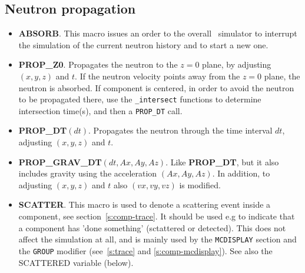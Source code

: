 \subsection{Neutron propagation}
\begin{itemize}
\item {\bf ABSORB}. This macro issues an order to the overall
  \MCS\ simulator to interrupt the simulation of the current neutron
  history and to start a new one.
\item {\bf PROP\_Z0}. Propagates the neutron to the $z=0$ plane,
  by adjusting $(x,y,z)$ and $t$. If the neutron velocity 
  points away from the $z=0$ plane, the neutron is absorbed.
  If component is centered, in order to avoid the neutron to be propagated
  there, use the \verb+_intersect+ functions to determine intersection time(s),
  and then a \verb+PROP_DT+ call.
\item {\bf PROP\_DT}$(dt)$. Propagates the neutron through the
  time interval $dt$, adjusting $(x,y,z)$ and $t$.
\item {\bf PROP\_GRAV\_DT}$(dt,Ax,Ay,Az)$. Like {\bf PROP\_DT}, but it also
  includes gravity using the acceleration $(Ax,Ay,Az)$. In addition,
  to adjusting $(x,y,z)$ and $t$ also $(vx,vy,vz)$ is modified.
\item {\bf SCATTER}. This macro is used to denote a scattering event
  inside a component, see section~\ref{s:comp-trace}. It should be used e.g 
  to indicate that a component has 'done something' (sctattered or detected).
  This does not affect the simulation at all, and is mainly used by the 
  \verb+MCDISPLAY+ section and the \verb+GROUP+ modifier (see~\ref{s:trace} and \ref{s:comp-mcdisplay}). See also the SCATTERED variable (below).
    
\end{itemize}

